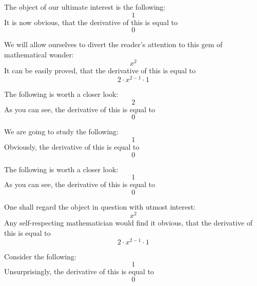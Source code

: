 \documentclass{article}
\begin{document}
The object of our ultimate interest is the following:
\begin{equation}
1 
\end{equation}
It is now obvious, that the derivative of this is equal to
\begin{equation}
0 
\end{equation}

We will allow ourselves to divert the reader's attention to this gem of mathematical wonder:
\begin{equation}
x ^{2 } 
\end{equation}
It can be easily proved, that the derivative of this is equal to
\begin{equation}
2 \cdot x ^{2 - 1 } \cdot 1 
\end{equation}

The following is worth a closer look:
\begin{equation}
2 
\end{equation}
As you can see, the derivative of this is equal to
\begin{equation}
0 
\end{equation}

We are going to study the following:
\begin{equation}
1 
\end{equation}
Obviously, the derivative of this is equal to
\begin{equation}
0 
\end{equation}

The following is worth a closer look:
\begin{equation}
1 
\end{equation}
As you can see, the derivative of this is equal to
\begin{equation}
0 
\end{equation}

One shall regard the object in question with utmost interest:
\begin{equation}
x ^{2 } 
\end{equation}
Any self-respecting mathematician would find it obvious, that the derivative of this is equal to
\begin{equation}
2 \cdot x ^{2 - 1 } \cdot 1 
\end{equation}

Consider the following:
\begin{equation}
1 
\end{equation}
Unsurprisingly, the derivative of this is equal to
\begin{equation}
0 
\end{equation}
\end{document}
